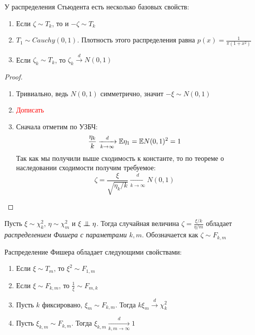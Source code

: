 \begin{proposition}
	У распределения Стьюдента есть несколько базовых свойств:
	\begin{enumerate}
		\item Если $\zeta \sim T_k$, то и $-\zeta \sim T_k$
		
		\item $T_1 \sim Cauchy(0, 1)$. Плотность этого распределения равна $p(x) = \frac{1}{\pi(1 + x^2)}$
		
		\item Если $\zeta_k \sim T_k$, то $\zeta_k \xrightarrow{d} N(0, 1)$
	\end{enumerate}
\end{proposition}

\begin{proof}~
	\begin{enumerate}
		\item Тривиально, ведь $N(0, 1)$ симметрично, значит $-\xi \sim N(0, 1)$
		
		\item \textcolor{red}{Дописать}
		
		\item Сначала отметим по УЗБЧ:
		\[
			\frac{\eta_k}{k} \xrightarrow[k \to \infty]{d} \mathbb{E} \eta_1 = \mathbb{E} N(0, 1)^2 = 1
		\]
		Так как мы получили выше сходимость к константе, то по теореме о наследовании сходимости получим требуемое:
		\[
			\zeta = \frac{\xi}{\sqrt{\eta_k / k}} \xrightarrow[k \to \infty]{d} N(0, 1)
		\]
	\end{enumerate}
\end{proof}

\begin{definition}
	Пусть $\xi \sim \chi_k^2$, $\eta \sim \chi_m^2$ и $\xi \perp\mkern-9.5mu\perp \eta$. Тогда случайная величина $\zeta = \frac{\xi / k}{\eta / m}$ обладает \textit{распределением Фишера с параметрами $k, m$}. Обозначается как $\zeta \sim F_{k, m}$
\end{definition}

\begin{proposition}
	Распределение Фишера обладает следующими свойствами:
	\begin{enumerate}
		\item Если $\xi \sim T_m$, то $\xi^2 \sim F_{1, m}$
		
		\item Если $\xi \sim F_{k, m}$, то $\frac{1}{\xi} \sim F_{m, k}$
		
		\item Пусть $k$ фиксировано, $\xi_m \sim F_{k, m}$. Тогда $k\xi_m \xrightarrow{d} \chi_k^2$
		
		\item Пусть $\xi_{k, m} \sim F_{k, m}$. Тогда $\xi_{k, m} \xrightarrow[k, m \to \infty]{d} 1$
	\end{enumerate}
\end{proposition}

